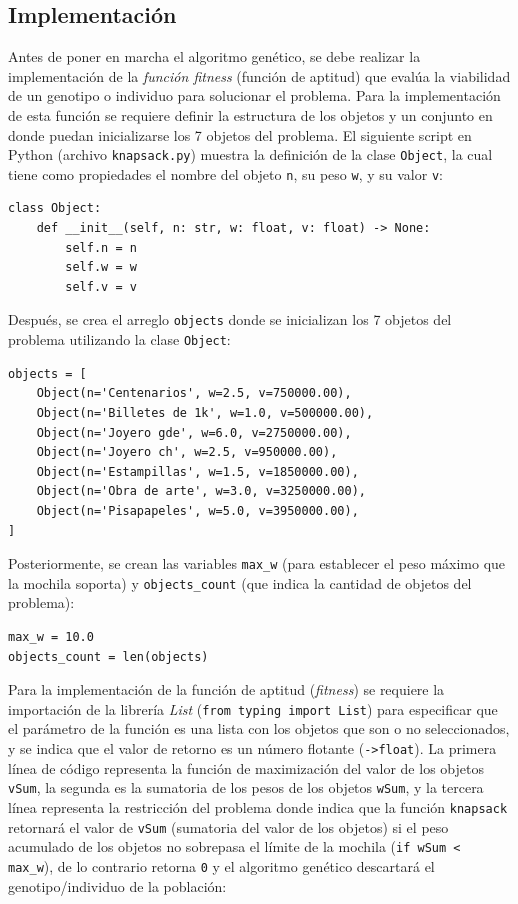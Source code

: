 \documentclass[a4paper, 12pt]{article}
\begin{document}
\subsection{Implementación}
Antes de poner en marcha el algoritmo genético, se debe realizar la implementación de la \emph{función fitness} (función de aptitud) que evalúa la viabilidad de un genotipo o individuo para solucionar el problema. Para la implementación de esta función se requiere definir la estructura de los objetos y un conjunto en donde puedan inicializarse los 7 objetos del problema. El siguiente script en Python (archivo \lstinline{knapsack.py}) muestra la definición de la clase \lstinline{Object}, la cual tiene como propiedades el nombre del objeto \lstinline{n}, su peso \lstinline{w}, y su valor \lstinline{v}:

\begin{lstlisting}
class Object:
    def __init__(self, n: str, w: float, v: float) -> None:
        self.n = n
        self.w = w
        self.v = v
\end{lstlisting}

Después, se crea el arreglo \lstinline{objects} donde se inicializan los 7 objetos del problema utilizando la clase \lstinline{Object}:

\begin{lstlisting}
objects = [
    Object(n='Centenarios', w=2.5, v=750000.00),
    Object(n='Billetes de 1k', w=1.0, v=500000.00),
    Object(n='Joyero gde', w=6.0, v=2750000.00),
    Object(n='Joyero ch', w=2.5, v=950000.00),
    Object(n='Estampillas', w=1.5, v=1850000.00),
    Object(n='Obra de arte', w=3.0, v=3250000.00),
    Object(n='Pisapapeles', w=5.0, v=3950000.00),
]
\end{lstlisting}

Posteriormente, se crean las variables \lstinline{max_w} (para establecer el peso máximo que la mochila soporta) y \lstinline{objects_count} (que indica la cantidad de objetos del problema):

\begin{lstlisting}
max_w = 10.0
objects_count = len(objects)
\end{lstlisting}

Para la implementación de la función de aptitud (\emph{fitness}) se requiere la importación de la librería \emph{List} (\lstinline{from typing import List}) para especificar que el parámetro de la función es una lista con los objetos que son o no seleccionados, y se indica que el valor de retorno es un número flotante (\lstinline{->float}). La primera línea de código representa la función de maximización del valor de los objetos \lstinline{vSum}, la segunda es la sumatoria de los pesos de los objetos \lstinline{wSum}, y la tercera línea representa la restricción del problema donde indica que la función \lstinline{knapsack} retornará el valor de \lstinline{vSum} (sumatoria del valor de los objetos) si el peso acumulado de los objetos no sobrepasa el límite de la mochila (\lstinline{if wSum < max_w}), de lo contrario retorna \lstinline{0} y el algoritmo genético descartará el genotipo/individuo de la población:
\end{document}
